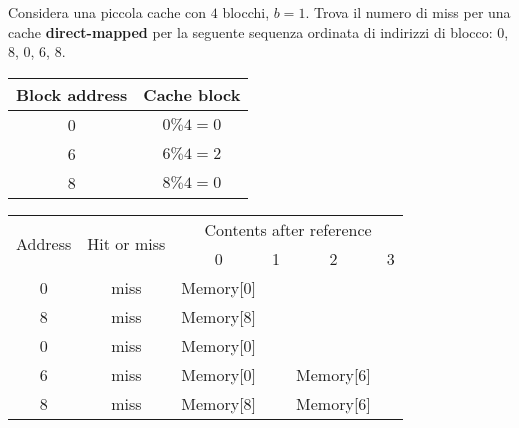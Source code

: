 \begin{example}
	Considera una piccola cache con $4$ blocchi, $b=1$. Trova il numero di miss per una cache \textbf{direct-mapped} per la seguente sequenza ordinata di indirizzi di blocco: 0, 8, 0, 6, 8.
	\begin{table}[h]
		\centering
		\begin{tabular}{|c|c|}
			\hline
			Block address & Cache block \\
			\hline
			0 & $0 \% 4=0$ \\
			6 & $6\% 4 = 2$\\
			8 & $8\%4=0$\\
			\hline
		\end{tabular}
	\end{table}
	\begin{table}[h]
		\centering
		\begin{tabular}{|c|c|c|c|c|c|}
			\hline
			\multirow{2}{*}{Address} & \multirow{2}{*}{Hit or miss} & \multicolumn{4}{c|}{Contents after reference} \\
			& & 0 & 1 & 2 & 3 \\
			\hline
			0 & miss & Memory[0] & & &\\
			8 & miss & Memory[8] & & &\\
			0 & miss & Memory[0] & & &\\
			6 & miss & Memory[0] & &Memory[6] &\\
			8 & miss & Memory[8] & &Memory[6] &\\
			\hline
		\end{tabular}
	\end{table}
\end{example}

